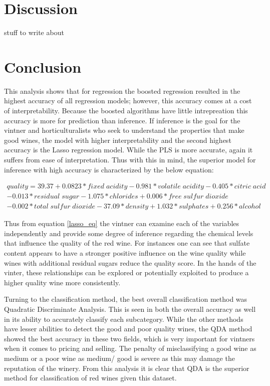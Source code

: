 \documentclass[]{article}
\begin{document}
\section{Discussion}\label{discussion}

stuff to write about \pagebreak

\section{Conclusion}\label{conclusion}

This analysis shows that for regression the boosted regression resulted
in the highest accuracy of all regression models; however, this accuracy
comes at a cost of interpretability. Because the boosted algorithms have
little intrepreation this accuracy is more for prediction than
inference. If inference is the goal for the vintner and
horticulturalists who seek to understand the properties that make good
wines, the model with higher interpretability and the second highest
accuracy is the Lasso regression model. While the PLS is more accurate,
again it suffers from ease of interpretation. Thus with this in mind,
the superior model for inference with high accuracy is characterized by
the below equation:\linebreak

\begin{equation}
\begin{aligned}
\label{lasso_eq}
quality = 39.37 + 0.0823 * fixed\;acidity -0.981 * volatile\;acidity -0.405 * citric\;acid \\
-0.013 *residual\;sugar -1.075 * chlorides + 0.006 * free\;sulfur\;dioxide\\
- 0.002 * total\;sulfur\;dioxide - 37.09 * density +1.032 * sulphates + 0.256 * alcohol
\end{aligned}
\end{equation}

Thus from equation \ref{lasso_eq} the vintner can examine each of the
variables independently and provide some degree of inference regarding
the chemical levels that influence the quality of the red wine. For
instances one can see that sulfate content appears to have a stronger
positive influence on the wine quality while wines with additional
residual sugars reduce the quality score. In the hands of the vinter,
these relationships can be explored or potentially exploited to produce
a higher quality wine more consistently. \linebreak

Turning to the classification method, the best overall classification
method was Quadratic Discriminate Analysis. This is seen in both the
overall accuracy as well in its ability to accurately classify each
subcategory. While the other methods have lesser abilities to detect the
good and poor quality wines, the QDA method showed the best accuracy in
these two fields, which is very important for vintners when it comes to
pricing and selling. The penalty of misclassifying a good wine as medium
or a poor wine as medium/ good is severe as this may damage the
reputation of the winery. From this analysis it is clear that QDA is the
superior method for classification of red wines given this dataset.
\end{document}
